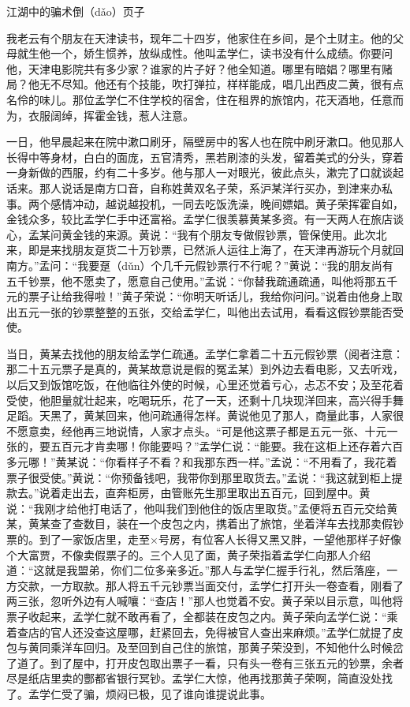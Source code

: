 \documentclass[12pt,UTF8]{ctexbook}
\begin{document}
江湖中的骗术倒（dǎo）页子


我老云有个朋友在天津读书，现年二十四岁，他家住在乡间，是个土财主。他的父母就生他一个，娇生惯养，放纵成性。他叫孟学仁，读书没有什么成绩。你要问他，天津电影院共有多少家？谁家的片子好？他全知道。哪里有暗娼？哪里有赌局？他无不尽知。他还有个技能，吹打弹拉，样样能成，唱几出西皮二黄，很有点名伶的味儿。那位孟学仁不住学校的宿舍，住在租界的旅馆内，花天酒地，任意而为，衣服阔绰，挥霍金钱，惹人注意。

一日，他早晨起来在院中漱口刷牙，隔壁房中的客人也在院中刷牙漱口。他见那人长得中等身材，白白的面庞，五官清秀，黑若刷漆的头发，留着美式的分头，穿着一身新做的西服，约有二十多岁。他与那人一对眼光，彼此点头，漱完了口就谈起话来。那人说话是南方口音，自称姓黄双名子荣，系沪某洋行买办，到津来办私事。两个感情冲动，越说越投机，一同去吃饭洗澡，晚间嫖娼。黄子荣挥霍自如，金钱众多，较比孟学仁手中还富裕。孟学仁很羡慕黄某多资。有一天两人在旅店谈心，孟某问黄金钱的来源。黄说：“我有个朋友专做假钞票，管保使用。此次北来，即是来找朋友趸货二十万钞票，已然派人运往上海了，在天津再游玩个月就回南方。”孟问：“我要趸（dǔn）个几千元假钞票行不行呢？”黄说：“我的朋友尚有五千钞票，他不愿卖了，愿意自己使用。”孟说：“你替我疏通疏通，叫他将那五千元的票子让给我得啦！”黄子荣说：“你明天听话儿，我给你问问。”说着由他身上取出五元一张的钞票整整的五张，交给孟学仁，叫他出去试用，看看这假钞票能否受使。

当日，黄某去找他的朋友给孟学仁疏通。孟学仁拿着二十五元假钞票（阅者注意：那二十五元票子是真的，黄某故意说是假的冤孟某）到外边去看电影，又去听戏，以后又到饭馆吃饭，在他临往外使的时候，心里还觉着亏心，忐忑不安；及至花着受使，他胆量就壮起来，吃喝玩乐，花了一天，还剩十几块现洋回来，高兴得手舞足蹈。天黑了，黄某回来，他问疏通得怎样。黄说他见了那人，商量此事，人家很不愿意卖，经他再三地说情，人家才点头。“可是他这票子都是五元一张、十元一张的，要五百元才肯卖哪！你能要吗？”孟学仁说：“能要。我在这柜上还存着六百多元哪！”黄某说：“你看样子不看？和我那东西一样。”孟说：“不用看了，我花着票子很受使。”黄说：“你预备钱吧，我带你到那里取货去。”孟说：“我这就到柜上提款去。”说着走出去，直奔柜房，由管账先生那里取出五百元，回到屋中。黄说：“我刚才给他打电话了，他叫我们到他住的饭店里取货。”孟便将五百元交给黄某，黄某查了查数目，装在一个皮包之内，携着出了旅馆，坐着洋车去找那卖假钞票的。到了一家饭店里，走至×号房，有位客人长得又黑又胖，一望他那样子好像个大富贾，不像卖假票子的。三个人见了面，黄子荣指着孟学仁向那人介绍道：“这就是我盟弟，你们二位多亲多近。”那人与孟学仁握手行礼，然后落座，一方交款，一方取款。那人将五千元钞票当面交付，孟学仁打开头一卷查看，刚看了两三张，忽听外边有人喊嚷：“查店！”那人也觉着不安。黄子荣以目示意，叫他将票子收起来，孟学仁就不敢再看了，全都装在皮包之内。黄子荣向孟学仁说：“乘着查店的官人还没查这屋哪，赶紧回去，免得被官人查出来麻烦。”孟学仁就提了皮包与黄同乘洋车回归。及至回到自己住的旅馆，那黄子荣没到，不知他什么时候岔了道了。到了屋中，打开皮包取出票子一看，只有头一卷有三张五元的钞票，余者尽是纸店里卖的酆都省银行冥钞。孟学仁大惊，他再找那黄子荣啊，简直没处找了。孟学仁受了骗，烦闷已极，见了谁向谁提说此事。
\end{document}
